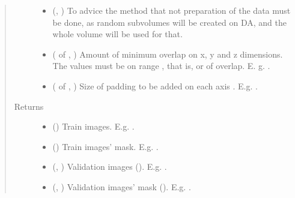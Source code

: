 \documentclass[letterpaper,10pt,english]{sphinxmanual}
\begin{document}
\begin{fulllineitems}
\begin{quote}
\begin{description}
\begin{itemize}
\item {} 
 (, ) \textendash{} To advice the method that not preparation of the data must be done, as random subvolumes will be created on
DA, and the whole volume will be used for that.

\item {} 
 ( of , ) \textendash{} Amount of minimum overlap on x, y and z dimensions. The values must be on range \sphinxcode{\sphinxupquote{{[}0, 1)}}, that is, 
or  of overlap. E. g. .

\item {} 
 ( of , ) \textendash{} Size of padding to be added on each axis . E.g. .

\end{itemize}

\item[{Returns}] \leavevmode
\begin{itemize}
\item {} 
 () \textendash{} Train images. E.g. .

\item {} 
 () \textendash{} Train images’ mask. E.g. .

\item {} 
 (, ) \textendash{} Validation images (). E.g. .

\item {} 
 (, ) \textendash{} Validation images’ mask (). E.g. .


\end{itemize}
\end{description}
\end{quote}
\end{fulllineitems}
\end{document}
